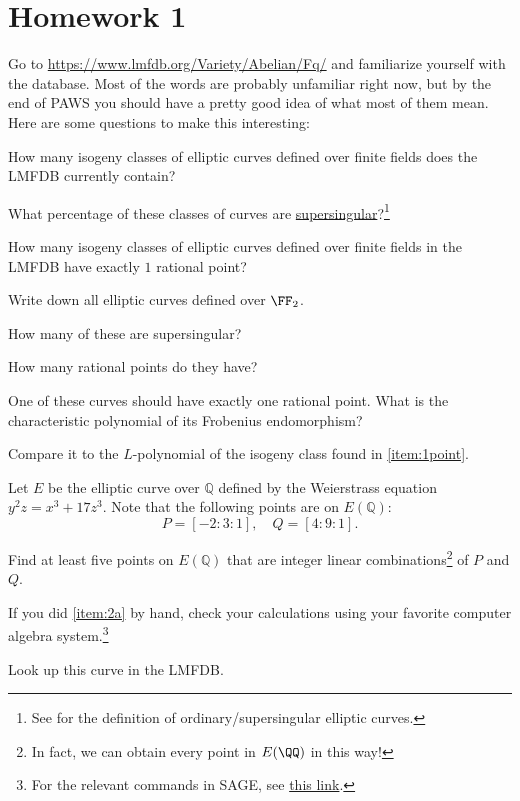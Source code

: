 \documentclass[../notes.tex]{subfiles}
\begin{document}
\section{Homework 1}

\begin{prob}
	Go to \url{https://www.lmfdb.org/Variety/Abelian/Fq/} and familiarize yourself with the database. Most of the words are probably unfamiliar right now, but by the end of PAWS you should have a pretty good idea of what most of them mean. Here are some questions to make this interesting:
    \begin{listalph}
        \item How many isogeny classes of elliptic curves defined over finite fields does the LMFDB currently contain?
        \item What percentage of these classes of curves are \href{https://en.wikipedia.org/wiki/Supersingular_elliptic_curve}{supersingular}?\footnote{See \cite[Chapter 5]{Silverman2009} for the definition of ordinary/supersingular elliptic curves.}
        \item \label{item:1point} How many isogeny classes of elliptic curves defined over finite fields in the LMFDB have exactly $1$ rational point?
        \item Write down all elliptic curves defined over $\FF_2$.
        \begin{listroman}
            \item How many of these are supersingular?
            \item How many rational points do they have?
            \item One of these curves should have exactly one rational point. What is the characteristic polynomial of its Frobenius endomorphism? 
            \item Compare it to the $L$-polynomial of the isogeny class found in \autoref{item:1point}.
        \end{listroman}
    \end{listalph}
\end{prob}

\begin{prob}
	Let $E$ be the elliptic curve over $\mathbb{Q}$ defined by the Weierstrass equation $y^2z = x^3 + 17z^3$.
    Note that the following points are on $E(\mathbb{Q})$: 
    \[P = [-2:3:1], \quad Q = [4:9:1].\]
    \begin{listalph}
        \item \label{item:2a} Find at least five points on $E(\mathbb{Q})$ that are integer linear combinations\footnote{In fact, we can obtain every point in $E(\QQ)$ in this way!} of $P$ and $Q$. 
        \item  If you did \autoref{item:2a} by hand, check your calculations using your favorite computer algebra system.\footnote{For the relevant commands in SAGE, see \href{https://doc.sagemath.org/html/en/reference/arithmetic_curves/sage/schemes/elliptic_curves/ell_point.html}{this link}.}
        \item Look up this curve in the LMFDB.
    \end{listalph}
\end{prob}
\end{document}
